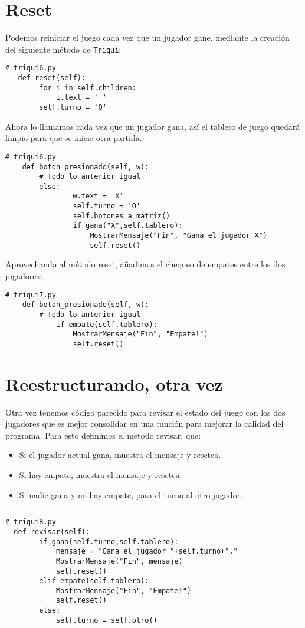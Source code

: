 \section{Reset}

Podemos reiniciar el juego cada vez que un jugador gane, mediante
la creación del siguiente método de \texttt{Triqui}:

\begin{lstlisting}
# triqui6.py
   def reset(self):
        for i in self.children:
            i.text = ' '
        self.turno = 'O'
\end{lstlisting}

Ahora lo llamamos cada vez que un jugador gana, así el tablero de
juego quedará limpio para que se inicie otra partida.

\begin{lstlisting}
# triqui6.py
    def boton_presionado(self, w):
        # Todo lo anterior igual
        else:
                w.text = 'X'
                self.turno = 'O'
                self.botones_a_matriz()
                if gana("X",self.tablero):
                    MostrarMensaje("Fin", "Gana el jugador X")
                    self.reset()
\end{lstlisting}

Aprovechando al método reset, añadimos el chequeo de empates entre
los dos jugadores:

\begin{lstlisting}
# triqui7.py
    def boton_presionado(self, w):
        # Todo lo anterior igual
            if empate(self.tablero):
                MostrarMensaje("Fin", "Empate!")
                self.reset()
\end{lstlisting}

\section{Reestructurando, otra vez}

Otra vez tenemos código parecido para revisar el estado del juego
con los dos jugadores que es mejor consolidar en una función para
mejorar la calidad del programa. Para esto definimos el método revisar,
que:
\begin{itemize}
\item Si el jugador actual gana, muestra el mensaje y resetea.
\item Si hay empate, muestra el mensaje y resetea.
\item Si nadie gana y no hay empate, pasa el turno al otro jugador. 
\end{itemize}
\begin{verbatim}

\end{verbatim}
\begin{lstlisting}
# triqui8.py
  def revisar(self):          
        if gana(self.turno,self.tablero):
            mensaje = "Gana el jugador "+self.turno+"."
            MostrarMensaje("Fin", mensaje)
            self.reset()
        elif empate(self.tablero):
            MostrarMensaje("Fin", "Empate!")
            self.reset()
        else:
            self.turno = self.otro()
\end{lstlisting}

